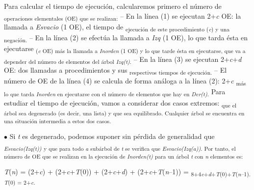 \documentclass[12pt]{article}
\renewcommand{\_}{\kern-1.5pt\textunderscore\kern-1.5pt}
\begin{document}
\begin{adjustwidth}{0.58in}{0.57in}
\begin{justify}
{\fontsize{10pt}{12.0pt}\selectfont Para calcular el tiempo de ejecución, calcularemos primero el número de \textsubscript{operaciones elementales (OE) que se realizan: }– En la línea (1) se ejecutan 2+\textit{c }OE: la llamada a \textit{Esvacio }(1 OE), el tiempo de \textsubscript{ejecución de este procedimiento (\textit{c}) y una negación. }– En la línea (2) se efectúa la llamada a \textit{Izq }(1 OE), lo que tarda ésta en ejecutarse \textsubscript{(\textit{c }OE) más la llamada a \textit{Inorden }(1 OE) y lo que tarde ésta en ejecutarse, que va a depender del número de elementos del árbol \textit{Izq(t)}. }– En la línea (3) se ejecutan 2+\textit{c}+\textit{d }OE: dos llamadas a procedimientos y sus \textsubscript{respectivos tiempos de ejecución. }– El número de OE de la línea (4) se calcula de forma análoga a la línea (2): 2+\textit{c }\textsubscript{más lo que tarda \textit{Inorden }en ejecutarse con el número de elementos que hay en \textit{Der(t)}. }Para estudiar el tiempo de ejecución, vamos a considerar dos casos extremos: \textsubscript{que el árbol sea degenerado (es decir, una lista) y que sea equilibrado. Cualquier árbol se encuentra en una situación intermedia a estos dos casos. }\par}
\end{justify}\par

\end{adjustwidth}

\begin{adjustwidth}{0.58in}{0.57in}
{\fontsize{10pt}{12.0pt}\selectfont $\bullet$  Si \textit{t }es degenerado, podemos suponer sin pérdida de generalidad que \textit{\textsubscript{Esvacio(Izq(t)) }}\textsubscript{y que para todo \textit{a }subárbol de \textit{t }se verifica que \textit{Esvacio(Izq(a))}. Por tanto, el número de OE que se realizan en la ejecución de \textit{Inorden(t) }para un árbol \textit{t }con \textit{n }elementos es: }\par}\par

\end{adjustwidth}

\begin{adjustwidth}{1.17in}{1.72in}
{\fontsize{10pt}{12.0pt}\selectfont \textit{T}(\textit{n}) = (2+\textit{c}) + (2+\textit{c}+\textit{T}(0)) + (2+\textit{c}+\textit{d}) + (2+\textit{c}+\textit{T}(\textit{n}–1)) = \textsubscript{8+4\textit{c}+\textit{d}+\textit{T}(0)+\textit{T}(\textit{n}–1). \textit{T}(0) = 2+\textit{c}. }\par}\par

\end{adjustwidth}
\end{document}

